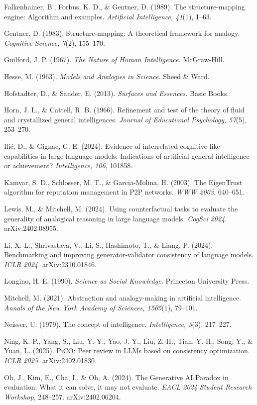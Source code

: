 \documentclass{article}
\begin{document}
Falkenhainer, B., Forbus, K. D., \& Gentner, D. (1989). The structure-mapping engine: Algorithm and examples. \emph{Artificial Intelligence, 41}(1), 1--63.

Gentner, D. (1983). Structure-mapping: A theoretical framework for analogy. \emph{Cognitive Science, 7}(2), 155--170.

Guilford, J. P. (1967). \emph{The Nature of Human Intelligence.} McGraw-Hill.

Hesse, M. (1963). \emph{Models and Analogies in Science.} Sheed \& Ward.

Hofstadter, D., \& Sander, E. (2013). \emph{Surfaces and Essences.} Basic Books.

Horn, J. L., \& Cattell, R. B. (1966). Refinement and test of the theory of fluid and crystallized general intelligences. \emph{Journal of Educational Psychology, 57}(5), 253--270.

Ili\'{c}, D., \& Gignac, G. E. (2024). Evidence of interrelated cognitive-like capabilities in large language models: Indications of artificial general intelligence or achievement? \emph{Intelligence, 106}, 101858.

Kamvar, S. D., Schlosser, M. T., \& Garcia-Molina, H. (2003). The EigenTrust algorithm for reputation management in P2P networks. \emph{WWW 2003}, 640--651.

Lewis, M., \& Mitchell, M. (2024). Using counterfactual tasks to evaluate the generality of analogical reasoning in large language models. \emph{CogSci 2024.} arXiv:2402.08955.

Li, X. L., Shrivastava, V., Li, S., Hashimoto, T., \& Liang, P. (2024). Benchmarking and improving generator-validator consistency of language models. \emph{ICLR 2024.} arXiv:2310.01846.

Longino, H. E. (1990). \emph{Science as Social Knowledge.} Princeton University Press.

Mitchell, M. (2021). Abstraction and analogy-making in artificial intelligence. \emph{Annals of the New York Academy of Sciences, 1505}(1), 79--101.

Neisser, U. (1979). The concept of intelligence. \emph{Intelligence, 3}(3), 217--227.

Ning, K.-P., Yang, S., Liu, Y.-Y., Yao, J.-Y., Liu, Z.-H., Tian, Y.-H., Song, Y., \& Yuan, L. (2025). PiCO: Peer review in LLMs based on consistency optimization. \emph{ICLR 2025.} arXiv:2402.01830.

Oh, J., Kim, E., Cha, I., \& Oh, A. (2024). The Generative AI Paradox in evaluation: What it can solve, it may not evaluate. \emph{EACL 2024 Student Research Workshop}, 248--257. arXiv:2402.06204.
\end{document}
